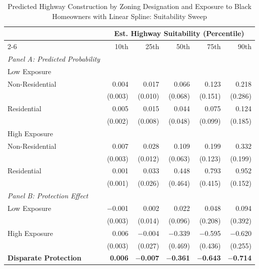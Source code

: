 \begin{table}[h]
\centering
\caption{Predicted Highway Construction by Zoning Designation and Exposure to Black Homeowners with Linear Spline: Suitability Sweep}
\label{tab:predicted_outcomes/black_homeowners_sweep_logitinteractions}
\begin{threeparttable}
\begin{tabular}{lr@{\hspace{1.2em}}r@{\hspace{1.2em}}r@{\hspace{1.2em}}r@{\hspace{1.2em}}r@{\hspace{1.2em}}}
\toprule
 & \multicolumn{5}{c}{Est. Highway Suitability (Percentile)} \\
\cmidrule(l){2-6}
 & 10th & 25th & 50th & 75th & 90th \\
\midrule
\textit{Panel A: Predicted Probability} & & & & & \\
\addlinespace[2pt]
Low Exposure & & & & & \\
\quad Non-Residential & 0.004 & 0.017 & 0.066 & 0.123 & 0.218 \\
 & (0.003) & (0.010) & (0.068) & (0.151) & (0.286) \\[4pt]
\quad Residential & 0.005 & 0.015 & 0.044 & 0.075 & 0.124 \\
 & (0.002) & (0.008) & (0.048) & (0.099) & (0.185) \\[4pt]
High Exposure & & & & & \\
\quad Non-Residential & 0.007 & 0.028 & 0.109 & 0.199 & 0.332 \\
 & (0.003) & (0.012) & (0.063) & (0.123) & (0.199) \\[4pt]
\quad Residential & 0.001 & 0.033 & 0.448 & 0.793 & 0.952 \\
 & (0.001) & (0.026) & (0.464) & (0.415) & (0.152) \\[4pt]
\midrule
\textit{Panel B: Protection Effect} & & & & & \\
\addlinespace[2pt]
Low Exposure & $-$0.001 & 0.002 & 0.022 & 0.048 & 0.094 \\
 & (0.003) & (0.014) & (0.096) & (0.208) & (0.392) \\[4pt]
High Exposure & 0.006\rlap{$^{**}$} & $-$0.004 & $-$0.339 & $-$0.595 & $-$0.620\rlap{$^{**}$} \\
 & (0.003) & (0.027) & (0.469) & (0.436) & (0.255) \\[4pt]
\addlinespace[2pt]
\textbf{Disparate Protection} & \textbf{0.006}\rlap{$^{**}$} & \textbf{$-$0.007} & \textbf{$-$0.361} & \textbf{$-$0.643} & \textbf{$-$0.714} \\

\end{tabular}
\end{threeparttable}
\end{table}
